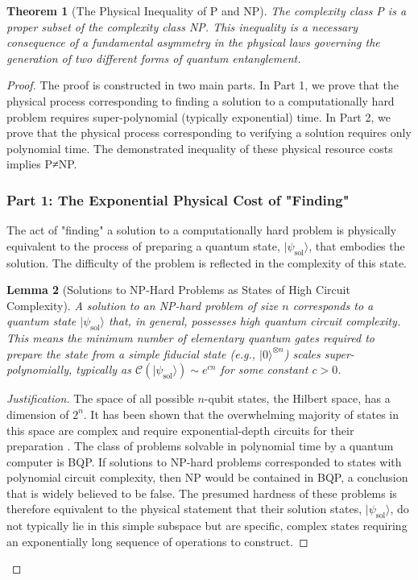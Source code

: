 \documentclass[11pt, letterpaper]{report}
\theoremstyle{plain} %
\newtheorem{theorem}{Theorem}[chapter]
\newtheorem{lemma}[theorem]{Lemma}
\theoremstyle{definition} %
\theoremstyle{remark} %
\begin{document}
\begin{theorem}[The Physical Inequality of P and NP]
\label{thm:p_ne_np}
The complexity class P is a proper subset of the complexity class NP. This inequality is a necessary consequence of a fundamental asymmetry in the physical laws governing the generation of two different forms of quantum entanglement.
\end{theorem}
\begin{proof} %
The proof is constructed in two main parts. In Part 1, we prove that the physical process corresponding to finding a solution to a computationally hard problem requires super-polynomial (typically exponential) time. In Part 2, we prove that the physical process corresponding to verifying a solution requires only polynomial time. The demonstrated inequality of these physical resource costs implies P≠NP.

\subsubsection*{Part 1: The Exponential Physical Cost of "Finding"}

The act of "finding" a solution to a computationally hard problem is physically equivalent to the process of preparing a quantum state, $|\psi_{\text{sol}}\rangle$, that embodies the solution. The difficulty of the problem is reflected in the complexity of this state.

\begin{lemma}[Solutions to NP-Hard Problems as States of High Circuit Complexity]
A solution to an NP-hard problem of size $n$ corresponds to a quantum state $|\psi_{\text{sol}}\rangle$ that, in general, possesses high quantum circuit complexity. This means the minimum number of elementary quantum gates required to prepare the state from a simple fiducial state (e.g., $|0\rangle^{\otimes n}$) scales super-polynomially, typically as $\mathcal{C}(|\psi_{\text{sol}}\rangle) \sim e^{cn}$ for some constant $c>0$.
\end{lemma}
\begin{proof}[Justification]
The space of all possible $n$-qubit states, the Hilbert space, has a dimension of $2^n$. It has been shown that the overwhelming majority of states in this space are complex and require exponential-depth circuits for their preparation \cite{NielsenChuang2010}. The class of problems solvable in polynomial time by a quantum computer is BQP. If solutions to NP-hard problems corresponded to states with polynomial circuit complexity, then NP would be contained in BQP, a conclusion that is widely believed to be false. The presumed hardness of these problems is therefore equivalent to the physical statement that their solution states, $|\psi_{\text{sol}}\rangle$, do not typically lie in this simple subspace but are specific, complex states requiring an exponentially long sequence of operations to construct.
\end{proof}


\end{proof}
\end{document}
